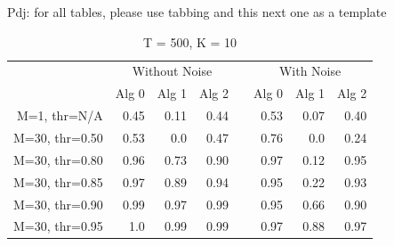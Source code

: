 \documentclass[conference]{IEEEtran}
\newcommand{\p}[1]{{\color{blue} Pdj: #1}}
\begin{document}



\p{for all tables, please use tabbing and this next one as a template}
\begin{table}[h!]
  \begin{center}
    \renewcommand{\arraystretch}{1.2}
    \begin{tabular}{@{}r rrr c rrr@{}}
      \toprule
      & \multicolumn{3}{c}{Without Noise} & & \multicolumn{3}{c}{With Noise} \\
      \cmidrule{2-4} \cmidrule{6-8}
                       & Alg 0 & Alg 1 & Alg 2 && Alg 0 & Alg 1 & Alg 2 \\
      \midrule
      {M=1, \hfill thr=N/A}
                       & 0.45  & 0.11  & 0.44  && 0.53  & 0.07  & 0.40  \\
      {M=30, thr=0.50} & 0.53  & 0.0   & 0.47  && 0.76  & 0.0   & 0.24  \\
      {M=30, thr=0.80} & 0.96  & 0.73  & 0.90  && 0.97  & 0.12  & 0.95  \\
      {M=30, thr=0.85} & 0.97  & 0.89  & 0.94  && 0.95  & 0.22  & 0.93  \\
      {M=30, thr=0.90} & 0.99  & 0.97  & 0.99  && 0.95  & 0.66  & 0.90  \\
      {M=30, thr=0.95} & 1.0   & 0.99  & 0.99  && 0.97  & 0.88  & 0.97  \\
      \bottomrule
    \end{tabular}
    \caption{T = 500, K = 10}
    \label{tab:1}
  \end{center}
\end{table}
\end{document}
